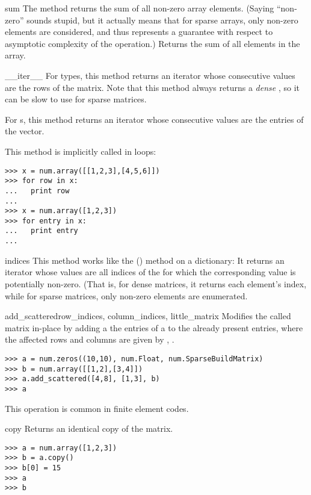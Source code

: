 \begin{methoddesc}{sum}{}
  The  method returns the sum of all non-zero array elements. (Saying
  ``non-zero'' sounds stupid, but it actually means that for sparse arrays,
  only non-zero elements are considered, and thus represents a guarantee
  with respect to asymptotic complexity of the operation.)
  Returns the sum of all elements in the array.
\end{methoddesc}
\begin{methoddesc}{__iter__}{}
  For  types, this method returns an iterator whose
  consecutive values are the rows of the matrix. Note that this method
  always returns a \emph{dense} , so it can be slow
  to use for sparse matrices.

  For s, this method returns an iterator whose
  consecutive values are the entries of the vector.

  This method is implicitly called in  loops:
\begin{verbatim}
>>> x = num.array([[1,2,3],[4,5,6]])
>>> for row in x:
...   print row
...
>>> x = num.array([1,2,3])
>>> for entry in x:
...   print entry
...
\end{verbatim}
\end{methoddesc}
\begin{methoddesc}{indices}{}
  This method works like the () method on a
  dictionary: It returns an iterator whose values are all indices
  of the  for which the corresponding value is
  potentially non-zero. (That is, for dense matrices, it returns
  each element's index, while for sparse matrices, only non-zero
  elements are enumerated.
\end{methoddesc}
\begin{methoddesc}{add_scattered}{row_indices, column_indices, little_matrix}
  Modifies the called matrix in-place by adding a the entries of a
   to the already present entries, where the
  affected rows and columns are given by ,
  .
\begin{verbatim}
>>> a = num.zeros((10,10), num.Float, num.SparseBuildMatrix)
>>> b = num.array([[1,2],[3,4]])
>>> a.add_scattered([4,8], [1,3], b)
>>> a
\end{verbatim}
  This operation is common in finite element codes.
\end{methoddesc}
\begin{methoddesc}{copy}{}
  Returns an identical copy of the matrix.
\begin{verbatim}
>>> a = num.array([1,2,3])
>>> b = a.copy()
>>> b[0] = 15
>>> a
>>> b
\end{verbatim}
\end{methoddesc}

